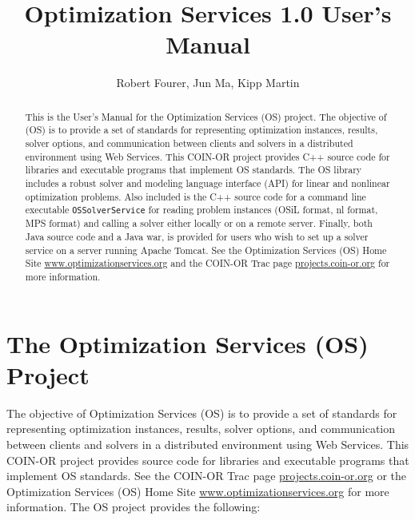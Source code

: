 \documentclass[11pt]{article}
\renewcommand{\_}{{\char"5F}}
\renewcommand{\{}{{\char"7B}}
\renewcommand{\}}{{\char"7D}}
\renewcommand{\^}{{\char"0D}}
\renewcommand{\'}{{\char"0D}}
\begin{document}
\title{Optimization Services 1.0 User's Manual }
\vskip 2in
\author{Robert Fourer, Jun Ma, Kipp Martin}
\maketitle

\begin{abstract}
This is the User's Manual for the Optimization Services (OS) project.  The objective of  (OS) is to provide a set of standards for representing optimization instances, results, solver options, and communication between clients and solvers in a distributed environment using Web Services. This COIN-OR project provides C++ source code for libraries and executable programs that implement OS standards.   The OS library includes a robust solver and modeling language interface (API) for linear and nonlinear optimization problems.   Also included is the C++ source code for a  command line executable {\tt OSSolverService}  for reading problem instances (OSiL format, nl format, MPS format) and calling a solver either locally or on a remote server.  Finally,  both Java source code and a Java war, is provided for users who wish to set up a solver service on a server running Apache Tomcat.   See the Optimization Services (OS) Home Site \url{www.optimizationservices.org} and the COIN-OR Trac page \url{projects.coin-or.org} for more information.
\end{abstract}


\newpage
\tableofcontents
\listoffigures
\listoftables
{}



\newpage

\section{The Optimization Services (OS) Project}

The objective of Optimization Services (OS) is to provide a set of standards for representing optimization instances, results, solver options, and communication between clients and solvers in a distributed environment using Web Services. This COIN-OR project provides source code for libraries and executable programs that implement OS standards.  See the COIN-OR Trac page \url{projects.coin-or.org} or the Optimization Services (OS) Home Site \url{www.optimizationservices.org}   for more information. The OS project provides the following:
\end{document}
